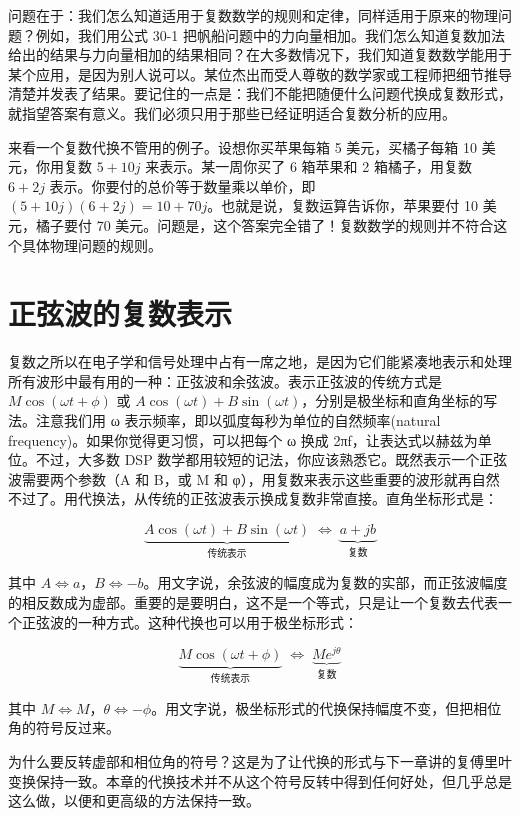 问题在于：我们怎么知道适用于复数数学的规则和定律，同样适用于原来的物理问题？例如，我们用公式
30-1
把帆船问题中的力向量相加。我们怎么知道复数加法给出的结果与力向量相加的结果相同？在大多数情况下，我们知道复数数学能用于某个应用，是因为别人说可以。某位杰出而受人尊敬的数学家或工程师把细节推导清楚并发表了结果。要记住的一点是：我们不能把随便什么问题代换成复数形式，就指望答案有意义。我们必须只用于那些已经证明适合复数分析的应用。

来看一个复数代换不管用的例子。设想你买苹果每箱 5 美元，买橘子每箱 10
美元，你用复数 \(5+10j\) 来表示。某一周你买了 6 箱苹果和 2
箱橘子，用复数 \(6+2j\) 表示。你要付的总价等于数量乘以单价，即
\((5+10j)(6+2j) = 10+70j\)。也就是说，复数运算告诉你，苹果要付 10
美元，橘子要付 70
美元。问题是，这个答案完全错了！复数数学的规则并不符合这个具体物理问题的规则。

\section{正弦波的复数表示}

复数之所以在电子学和信号处理中占有一席之地，是因为它们能紧凑地表示和处理所有波形中最有用的一种：正弦波和余弦波。表示正弦波的传统方式是
\(M\cos(\omega t + \phi)\) 或
\(A\cos(\omega t) + B\sin(\omega t)\)，分别是极坐标和直角坐标的写法。注意我们用
ω 表示频率，即以弧度每秒为单位的自然频率(natural
frequency)。如果你觉得更习惯，可以把每个 ω 换成
2πf，让表达式以赫兹为单位。不过，大多数 DSP
数学都用较短的记法，你应该熟悉它。既然表示一个正弦波需要两个参数（A 和
B，或 M 和
φ），用复数来表示这些重要的波形就再自然不过了。用代换法，从传统的正弦波表示换成复数非常直接。直角坐标形式是：

\[\underbrace{A\cos(\omega t) + B\sin(\omega t)}_{\text{传统表示}} \;\Longleftrightarrow\; \underbrace{a + jb}_{\text{复数}}\]

其中
\(A \Leftrightarrow a\)，\(B \Leftrightarrow -b\)。用文字说，余弦波的幅度成为复数的实部，而正弦波幅度的相反数成为虚部。重要的是要明白，这不是一个等式，只是让一个复数去代表一个正弦波的一种方式。这种代换也可以用于极坐标形式：

\[\underbrace{M\cos(\omega t + \phi)}_{\text{传统表示}} \;\Longleftrightarrow\; \underbrace{M e^{j\theta}}_{\text{复数}}\]

其中
\(M \Leftrightarrow M\)，\(\theta \Leftrightarrow -\phi\)。用文字说，极坐标形式的代换保持幅度不变，但把相位角的符号反过来。

为什么要反转虚部和相位角的符号？这是为了让代换的形式与下一章讲的复傅里叶变换保持一致。本章的代换技术并不从这个符号反转中得到任何好处，但几乎总是这么做，以便和更高级的方法保持一致。

